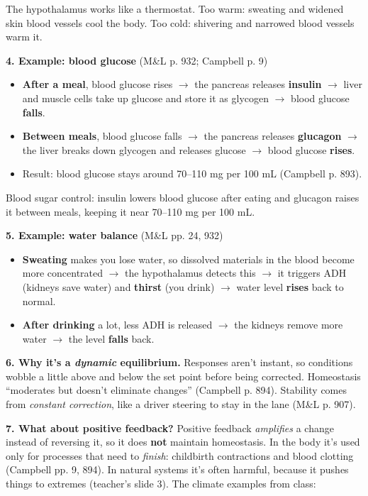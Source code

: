 \documentclass[11pt,letterpaper]{article}
\begin{document}
  {The hypothalamus works like a thermostat. Too warm: sweating and widened skin blood vessels cool the body. Too cold: shivering and narrowed blood vessels warm it.}

\textbf{4. Example: blood glucose} (M\&L p. 932; Campbell p. 9)
\begin{itemize}
  \item \textbf{After a meal}, blood glucose rises $\rightarrow$ the pancreas releases \textbf{insulin} $\rightarrow$ liver and muscle cells take up glucose and store it as glycogen $\rightarrow$ blood glucose \textbf{falls}.
  \item \textbf{Between meals}, blood glucose falls $\rightarrow$ the pancreas releases \textbf{glucagon} $\rightarrow$ the liver breaks down glycogen and releases glucose $\rightarrow$ blood glucose \textbf{rises}.
  \item Result: blood glucose stays around 70–110 mg per 100 mL (Campbell p. 893).
\end{itemize}

  {Blood sugar control: insulin lowers blood glucose after eating and glucagon raises it between meals, keeping it near 70–110 mg per 100 mL.}

\textbf{5. Example: water balance} (M\&L pp. 24, 932)
\begin{itemize}
  \item \textbf{Sweating} makes you lose water, so dissolved materials in the blood become more concentrated $\rightarrow$ the hypothalamus detects this $\rightarrow$ it triggers ADH (kidneys save water) and \textbf{thirst} (you drink) $\rightarrow$ water level \textbf{rises} back to normal.
  \item \textbf{After drinking} a lot, less ADH is released $\rightarrow$ the kidneys remove more water $\rightarrow$ the level \textbf{falls} back.
\end{itemize}

\textbf{6. Why it's a \emph{dynamic} equilibrium.} Responses aren't instant, so conditions wobble a little above and below the set point before being corrected. Homeostasis ``moderates but doesn't eliminate changes'' (Campbell p. 894). Stability comes from \emph{constant correction}, like a driver steering to stay in the lane (M\&L p. 907).

\textbf{7. What about positive feedback?} Positive feedback \emph{amplifies} a change instead of reversing it, so it does \textbf{not} maintain homeostasis. In the body it's used only for processes that need to \emph{finish}: childbirth contractions and blood clotting (Campbell pp. 9, 894). In natural systems it's often harmful, because it pushes things to extremes (teacher's slide 3). The climate examples from class:
\end{document}
